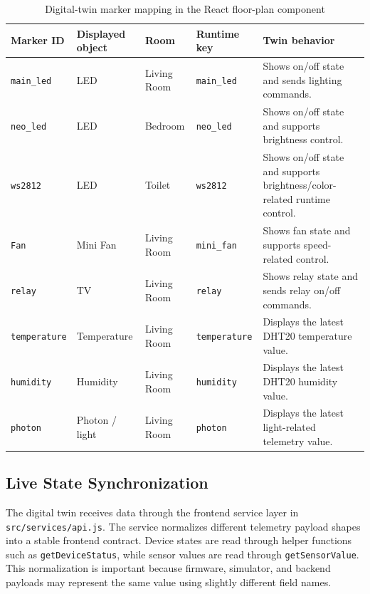 \begin{table}[H]
    \centering
    \caption{Digital-twin marker mapping in the React floor-plan component}
    \label{tab:digital-twin-marker-map}
    \renewcommand{\arraystretch}{1.16}
    \small
    \begin{tabularx}{\textwidth}{@{}p{2.4cm}p{2.5cm}p{2.4cm}p{2.2cm}X@{}}
        \toprule
        \textbf{Marker ID} & \textbf{Displayed object} & \textbf{Room} & \textbf{Runtime key} & \textbf{Twin behavior} \\
        \midrule
        \texttt{main\_led} & LED & Living Room & \texttt{main\_led} & Shows on/off state and sends lighting commands. \\
        \texttt{neo\_led} & LED & Bedroom & \texttt{neo\_led} & Shows on/off state and supports brightness control. \\
        \texttt{ws2812} & LED & Toilet & \texttt{ws2812} & Shows on/off state and supports brightness/color-related runtime control. \\
        \texttt{Fan} & Mini Fan & Living Room & \texttt{mini\_fan} & Shows fan state and supports speed-related control. \\
        \texttt{relay} & TV & Living Room & \texttt{relay} & Shows relay state and sends relay on/off commands. \\
        \texttt{temperature} & Temperature & Living Room & \texttt{temperature} & Displays the latest DHT20 temperature value. \\
        \texttt{humidity} & Humidity & Living Room & \texttt{humidity} & Displays the latest DHT20 humidity value. \\
        \texttt{photon} & Photon / light & Living Room & \texttt{photon} & Displays the latest light-related telemetry value. \\
        \bottomrule
    \end{tabularx}
\end{table}

\subsection{Live State Synchronization}

The digital twin receives data through the frontend service layer in \texttt{src/services/api.js}. The service normalizes different telemetry payload shapes into a stable frontend contract. Device states are read through helper functions such as \texttt{getDeviceStatus}, while sensor values are read through \texttt{getSensorValue}. This normalization is important because firmware, simulator, and backend payloads may represent the same value using slightly different field names.

